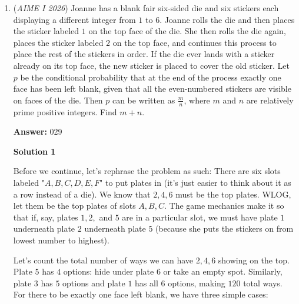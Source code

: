 \begin{enumerate}
 
This yields$9 \cdot 9 \cdot 18 \cdot 9 = 13{,}122$ values.

 
Case 2: even exponent of $7$ and odd exponent of $17$.

 
There are $9$ choices for the even exponent of $7$, $9$ choices for the even exponent of $11$, $18$ choices for the exponent of $13$ as it is $1 \pmod{12}$, and $9$ choices for the odd exponent of $17$.This also yields$9 \cdot 9 \cdot 18 \cdot 9 = 13{,}122$ values.

 
Thus, the total number is$13{,}122 + 13{,}122 = 26{,}244 \equiv \boxed{244} \pmod{1000}$.

 


	\item (\textit{AIME I 2026}) Joanne has a blank fair six-sided die and six stickers each displaying a different integer from $1$ to $6$. Joanne rolls the die and then places the sticker labeled $1$ on the top face of the die. She then rolls the die again, places the sticker labeled $2$ on the top face, and continues this process to place the rest of the stickers in order. If the die ever lands with a sticker already on its top face, the new sticker is placed to cover the old sticker. Let $p$ be the conditional probability that at the end of the process exactly one face has been left blank, given that all the even-numbered stickers are visible on faces of the die. Then $p$ can be written as $\frac{m}{n}$, where $m$ and $n$ are relatively prime positive integers. Find $m+n$.


 
 \textbf{Answer: }029



\textbf{Solution 1}

Before we continue, let's rephrase the problem as such: There are six slots labeled "$A, B, C, D, E, F$" to put plates in (it's just easier to think about it as a row instead of a die). We know that $2, 4, 6$ must be the top plates. WLOG, let them be the top plates of slots $A, B, C$. The game mechanics make it so that if, say, plates $1, 2,$ and $5$ are in a particular slot, we must have plate $1$ underneath plate $2$ underneath plate $5$ (because she puts the stickers on from lowest number to highest). 

 Let's count the total number of ways we can have $2,4,6$ showing on the top. Plate $5$ has $4$ options: hide under plate $6$ or take an empty spot. Similarly, plate $3$ has $5$ options and plate $1$ has all $6$ options, making $120$ total ways. For there to be exactly one face left blank, we have three simple cases:


\end{enumerate}
